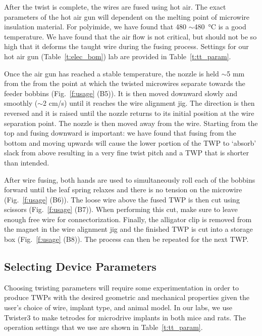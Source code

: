 \documentclass[11pt,a4paper]{article}
\begin{document}
After the twist is complete, the wires are fused using hot air. The exact
parameters of the hot air gun will dependent on the melting point of microwire
insulation material. For polyimide, we have found that 480
$\sim$\SI{480}{\celsius} is a good temperature. We have found that the air flow
is not critical, but should not be so high that it deforms the taught wire
during the fusing process. Settings for our hot air gun
(Table~\ref{t:elec_bom}) lab are provided in Table~\ref{t:tt_param}.

Once the air gun has reached a stable temperature, the nozzle is held $\sim$5
mm from the from the point at which the twisted microwires separate towards the
feeder bobbins (Fig.~\ref{f:usage} (B5)). It is then moved downward slowly and
smoothly ($\sim$2 cm/s) until it reaches the wire alignment jig. The direction
is then reversed and it is raised until the nozzle returns to its initial
position at the wire separation point. The nozzle is then moved away from the
wire. Starting from the top and fusing downward is important: we have found
that fusing from the bottom and moving upwards will cause the lower portion of
the TWP to `absorb' slack from above resulting in a very fine twist pitch and a
TWP that is shorter than intended.

After wire fusing, both hands are used to simultaneously roll each of the
bobbins forward until the leaf spring relaxes and there is no tension on the
microwire (Fig.~\ref{f:usage} (B6)). The loose wire above the fused TWP is
then cut using scissors (Fig.~\ref{f:usage} (B7)). When performing this cut,
make sure to leave enough free wire for connectorization. Finally, the
alligator clip is removed from the magnet in the wire alignment jig and  the
finished TWP is cut into a storage box (Fig.~\ref{f:usage} (B8)). The process
can then be repeated for the next TWP.

\subsection{Selecting Device Parameters}
Choosing twisting parameters will require some experimentation in order to
produce TWPs with the desired geometric and mechanical properties given the
user's choice of wire, implant type, and animal model. In our labs, we use
Twister3 to make tetrodes for microdrive implants in both mice and rats. The
operation settings that we use are shown in Table~\ref{t:tt_param}. 
\end{document}
